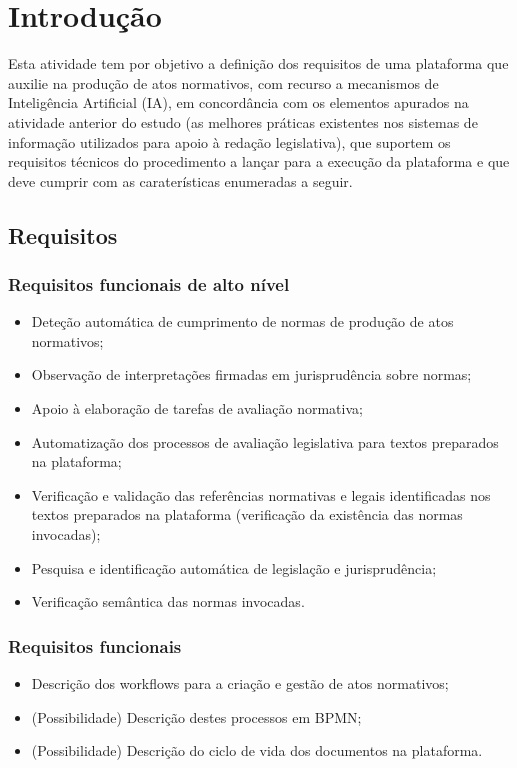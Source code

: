\chapter{Introdução}

Esta atividade tem por objetivo a definição dos requisitos de uma plataforma
que auxilie na produção de atos normativos, com recurso a mecanismos de 
Inteligência Artificial (IA), em concordância
com os elementos apurados na atividade anterior do estudo 
(as melhores práticas existentes nos
sistemas de informação utilizados para apoio à redação legislativa), 
que suportem os requisitos técnicos do procedimento a lançar para a execução 
da plataforma e que deve cumprir com as caraterísticas enumeradas a seguir.

\section{Requisitos}

\subsection{Requisitos funcionais de alto nível}

\begin{itemize}
\item Deteção automática de cumprimento de normas de produção de atos normativos;
\item Observação de interpretações firmadas em jurisprudência sobre normas;
\item Apoio à elaboração de tarefas de avaliação normativa;
\item Automatização dos processos de avaliação legislativa para textos preparados na plataforma;
\item Verificação e validação das referências normativas e legais identificadas nos textos preparados
na plataforma (verificação da existência das normas invocadas);
\item Pesquisa e identificação automática de legislação e jurisprudência;
\item Verificação semântica das normas invocadas.
\end{itemize}

\subsection{Requisitos funcionais}

\begin{itemize}
\item Descrição dos workflows para a criação e gestão de atos normativos;
\item (Possibilidade) Descrição destes processos em BPMN;
\item (Possibilidade) Descrição do ciclo de vida dos documentos na plataforma.
\end{itemize}

